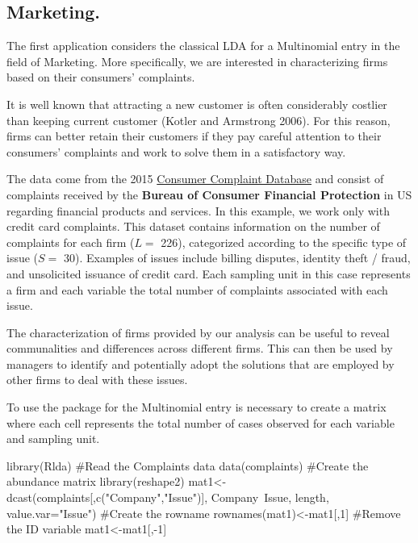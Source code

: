\documentclass[article]{jss}
\begin{document}
\subsection{Marketing.}\label{marketing.}

The first application considers the classical LDA for a Multinomial
entry in the field of Marketing. More specifically, we are interested in
characterizing firms based on their consumers' complaints.

It is well known that attracting a new customer is often considerably
costlier than keeping current customer (Kotler and Armstrong 2006). For
this reason, firms can better retain their customers if they pay careful
attention to their consumers' complaints and work to solve them in a
satisfactory way.

The data come from the 2015
\href{http://catalog.data.gov/dataset/consumer-complaint-database}{Consumer
Complaint Database} and consist of complaints received by the
\textbf{Bureau of Consumer Financial Protection} in US regarding
financial products and services. In this example, we work only with
credit card complaints. This dataset contains information on the number
of complaints for each firm (\(L=\) 226), categorized according to the
specific type of issue (\(S=\) 30). Examples of issues include billing
disputes, identity theft / fraud, and unsolicited issuance of credit
card. Each sampling unit in this case represents a firm and each
variable the total number of complaints associated with each issue.

The characterization of firms provided by our analysis can be useful to
reveal communalities and differences across different firms. This can
then be used by managers to identify and potentially adopt the solutions
that are employed by other firms to deal with these issues.

To use the  package for the Multinomial entry is necessary to
create a matrix where each cell represents the total number of cases
observed for each variable and sampling unit.

\begin{CodeChunk}
\begin{CodeInput}
library(Rlda)
#Read the Complaints data
data(complaints)
#Create the abundance matrix
library(reshape2)
mat1<-dcast(complaints[,c("Company","Issue")], 
            Company~Issue, length, 
            value.var="Issue")
#Create the rowname
rownames(mat1)<-mat1[,1]
#Remove the ID variable
mat1<-mat1[,-1]
\end{CodeInput}
\end{CodeChunk}
\end{document}
